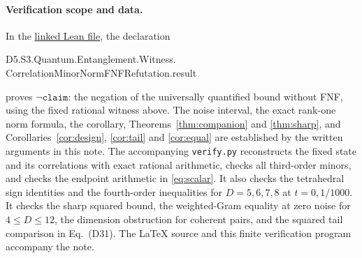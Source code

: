 \documentclass[11pt]{article}
\begin{document}
\paragraph{Verification scope and data.}
In the \href{https://github.com/the-omega-institute/trureturing/blob/0f1f822c673c1903dc6b0a209a23dacebca2aa6c/D5/S3/Quantum/Entanglement/Witness/CorrelationMinorNormFNFRefutation.lean}{linked Lean file},
the declaration
\begin{center}\small\ttfamily
D5.S3.Quantum.Entanglement.Witness.\\
CorrelationMinorNormFNFRefutation.result
\end{center}
proves $\neg\texttt{claim}$: the negation of the universally quantified
bound without FNF, using the fixed rational witness above.
The noise interval, the exact rank-one norm formula, the corollary,
Theorems~\ref{thm:companion} and \ref{thm:sharp}, and
Corollaries~\ref{cor:design}, \ref{cor:tail} and \ref{cor:equal}
are established by the written arguments in this note.
The accompanying \texttt{verify.py} reconstructs the fixed state and its
correlations with exact rational arithmetic, checks all third-order minors,
and checks the endpoint arithmetic in \eqref{eq:scalar}.
It also checks the tetrahedral sign identities and the fourth-order
inequalities for $D=5,6,7,8$ at $t=0,1/1000$.
It checks the sharp squared bound, the weighted-Gram equality at zero
noise for $4\le D\le12$, the dimension obstruction for coherent pairs,
and the squared tail comparison in Eq.~(D31).
The \LaTeX{} source and this finite verification program accompany the note.
\end{document}
